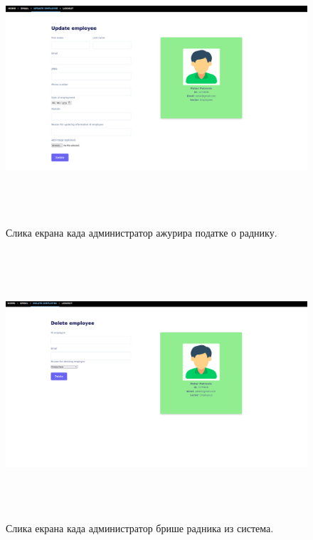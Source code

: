 \documentclass{article}
\begin{document}
\begin{figure}[H]
    \begin{center}
        \includegraphics[width=1.1\textwidth, height=10cm]{Dizajn/update_employee.png}
        \caption{Слика екрана када администратор ажурира податке о раднику.}
    \end{center}
\end{figure}

\begin{figure}[H]
    \begin{center}
        \includegraphics[width=1.1\textwidth, height=10cm]{Dizajn/delete_employee.png}
        \caption{Слика екрана када администратор брише радника из система.}
    \end{center}
\end{figure}
\end{document}
